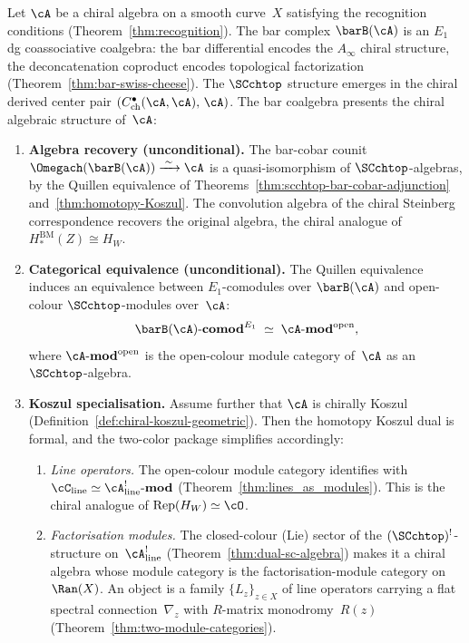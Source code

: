 \begin{theorem}
\label{thm:steinberg-presentation}
Let\/ $\cA$ be a chiral algebra on a smooth curve~$X$ satisfying the
recognition conditions
\textup{(}Theorem~\textup{\ref{thm:recognition})}.
The bar complex $\barB(\cA)$ is an $E_1$ dg coassociative
coalgebra: the bar differential encodes the $A_\infty$ chiral
structure, the deconcatenation coproduct encodes topological
factorization
\textup{(}Theorem~\textup{\ref{thm:bar-swiss-cheese})}.
The $\SCchtop$ structure emerges in the chiral derived center
pair $(C^\bullet_{\mathrm{ch}}(\cA,\cA),\, \cA)$.
The bar coalgebra
presents the chiral algebraic structure of\/~$\cA$:
\begin{enumerate}[label=\textup{(\roman*)}]
\item \textbf{Algebra recovery \textup{(}unconditional\textup{)}.}
 The bar-cobar counit
 $\Omegach(\barB(\cA)) \xrightarrow{\;\sim\;} \cA$
 is a quasi-isomorphism of $\SCchtop$-algebras, by the
 Quillen equivalence of
 Theorems~\textup{\ref{thm:scchtop-bar-cobar-adjunction}}
 and~\textup{\ref{thm:homotopy-Koszul}}.
 The convolution algebra of the chiral Steinberg correspondence
 recovers the original algebra, the chiral analogue of
 $H_\ast^{\mathrm{BM}}(Z) \cong H_W$.

\item \textbf{Categorical equivalence
 \textup{(}unconditional\textup{)}.}
 The Quillen equivalence induces an equivalence between
 $E_1$-comodules over $\barB(\cA)$ and
 open-colour $\SCchtop$-modules over~$\cA$:
 \[
 \barB(\cA)\textup{-}\mathbf{comod}^{E_1}
 \;\simeq\;
 \cA\textup{-}\mathbf{mod}^{\mathrm{open}},
 \]
 where $\cA\textup{-}\mathbf{mod}^{\mathrm{open}}$ is the
 open-colour module category of~$\cA$ as an
 $\SCchtop$-algebra.

\item \textbf{Koszul specialisation.}
 Assume further that\/ $\cA$ is chirally Koszul
 \textup{(}Definition~\textup{\ref{def:chiral-koszul-geometric})}.
 Then the homotopy Koszul dual is formal, and the two-color
 package simplifies accordingly:
 \begin{enumerate}[label=\textup{(\alph*)}]
 \item \emph{Line operators.}
 The open-colour module category identifies with
 $\cC_{\mathrm{line}} \simeq \cA^!_{\mathrm{line}}\textup{-}\mathbf{mod}$
 \textup{(}Theorem~\textup{\ref{thm:lines_as_modules})}.
 This is the chiral analogue of
 $\operatorname{Rep}(H_W) \simeq \cO$.
 \item \emph{Factorisation modules.}
 The closed-colour (Lie) sector of the $(\SCchtop)^{!}$-structure on~$\cA^!_{\mathrm{line}}$
 \textup{(}Theorem~\textup{\ref{thm:dual-sc-algebra})}
 makes it a chiral algebra whose module category is the
 factorisation-module category on~$\Ran(X)$. An object
 is a family $\{L_z\}_{z \in X}$ of line operators
 carrying a flat spectral connection~$\nabla_z$ with
 $R$-matrix monodromy~$R(z)$
 \textup{(}Theorem~\textup{\ref{thm:two-module-categories})}.
 \end{enumerate}


\end{enumerate}
\end{theorem}

